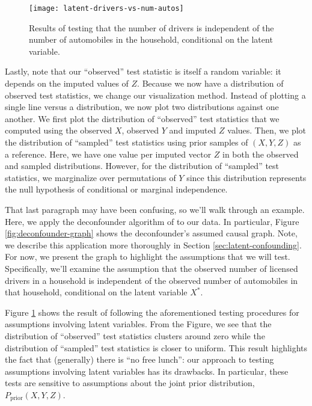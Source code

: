 \begin{figure}
   \centering
   \texttt{[image: latent-drivers-vs-num-autos]}
   \caption{Results of testing that the number of drivers is independent of the number of automobiles in the household, conditional on the latent variable.}
   \label{fig:latent-cit-results}
\end{figure}

Lastly, note that our ``observed'' test statistic is itself a random variable: it depends on the imputed values of $Z$.
Because we now have a distribution of observed test statistics, we change our visualization method.
Instead of plotting a single line versus a distribution, we now plot two distributions against one another.
We first plot the distribution of ``observed'' test statistics that we computed using the observed $X$, observed $Y$ and imputed $Z$ values.
Then, we plot the distribution of ``sampled'' test statistics using prior samples of $\left( X, Y, Z \right)$ as a reference.
Here, we have one value per imputed vector $Z$ in both the observed and sampled distributions.
However, for the distribution of ``sampled'' test statistics, we marginalize over permutations of $Y$ since this distribution represents the null hypothesis of conditional or marginal independence.

That last paragraph may have been confusing, so we'll walk through an example.
Here, we apply the deconfounder algorithm of \citet{wang_2019_blessings} to our data.
In particular, Figure \ref{fig:deconfounder-graph} shows the deconfounder's assumed causal graph.
Note, we describe this application more thoroughly in Section \ref{sec:latent-confounding}.
For now, we present the graph to highlight the assumptions that we will test.
Specifically, we'll examine the assumption that the observed number of licensed drivers in a household is independent of the observed number of automobiles in that household, conditional on the latent variable $X^{*}$.

Figure \ref{fig:latent-cit-results} shows the result of following the aforementioned testing procedures for assumptions involving latent variables.
From the Figure, we see that the distribution of ``observed'' test statistics clusters around zero while the distribution of ``sampled'' test statistics is closer to uniform.
This result highlights the fact that (generally) there is ``no free lunch'': our approach to testing assumptions involving latent variables has its drawbacks.
In particular, these tests are sensitive to assumptions about the joint prior distribution, $P_{\textrm{prior}} \left( X, Y, Z \right)$.

